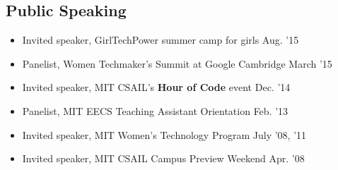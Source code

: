 \documentclass[margin]{res}
\begin{document}
\begin{resume}
%		 
 

\section{Public Speaking}
\begin{itemize}[leftmargin=*] \itemsep -2pt 
\item Invited speaker, GirlTechPower summer camp for girls \hfill Aug. '15 
\item Panelist, Women Techmaker's Summit at Google Cambridge \hfill March '15
\item Invited speaker, MIT CSAIL's {\bf Hour of Code} event \hfill Dec. '14
\item Panelist, MIT EECS Teaching Assistant Orientation \hfill Feb. '13
\item Invited speaker, MIT Women's Technology Program \hfill July '08, '11
\item Invited speaker, MIT CSAIL Campus Preview Weekend \hfill Apr. '08
\end{itemize}



\end{resume}
\end{document}
